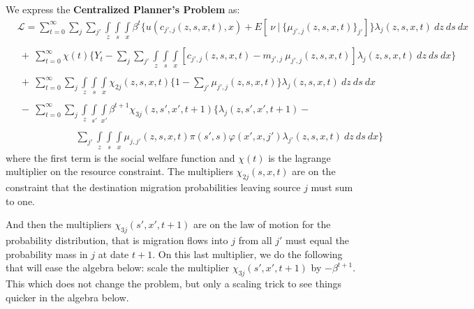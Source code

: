 \documentclass[12pt,pdftex]{article}
\begin{document}
\begin{onehalfspacing}
We express the \textbf{Centralized Planner's Problem} as:
{\small
\begin{align}
& \mathcal{L}  =   \sum_{t=0}^{\infty}\sum_{j} \sum_{j'} \int\limits_{z} \int\limits_{s} \int\limits_{x} \beta^{t} \bigg \{ u(c_{j',j}(z, s, x, t), x) + E[ \ \nu \ | \ \big\{\mu_{j',j}(z,s,x,t)\big\}_{j'}] \bigg \} \lambda_{j}(z, s, x, t) \ dz \ ds \ dx \label{eq:planner_L} \\
\nonumber \\
 & \ + \ \sum_{t=0}^{\infty} \chi(t) \bigg \{ Y_t - \sum_{j}\sum_{j'} \int\limits_{z} \int\limits_{s} \int\limits_{x} \left[ c_{j',j}(z, s, x, t)  -   m_{j',j} \ \mu_{j',j}(z, s, x, t)\right] \lambda_{j}(z, s, x, t) \ dz \ ds \ dx \bigg \} \nonumber \\
\nonumber  \\
& \ + \ \sum_{t=0}^{\infty} \sum_{j} \int\limits_{z} \int\limits_{s} \int\limits_{x} \chi_{2j}(z, s, x, t) \bigg \{1 - \sum_{j'} \mu_{j',j}(z, s, x,t) \bigg \} \lambda_{j}(z, s, x, t) \ dz \ ds \ dx \nonumber \\
\nonumber \\
& \ - \ \sum_{t=0}^{\infty} \sum_{j} \int\limits_{z} \int\limits_{s'} \int\limits_{x'} \beta^{t+1} \chi_{3j}(z, s', x', t+1) \bigg \{\lambda_{j}(z, s', x', t+1) - \nonumber \\
\nonumber \\
& \ \ \ \ \ \ \ \ \ \ \ \ \ \ \ \ \ \ \ \ \ \ \ \ \ \ \ 
 \sum_{j'} \int\limits_{z} \int\limits_{s} \int\limits_{x} \mu_{j,j'}(z,s,x,t) \pi(s',s) \varphi(x',x, j') \lambda_{j'}(z,s, x, t) \ dz \ ds  \ dx  \bigg \} \nonumber
\end{align}}
where the first term is the social welfare function and $\chi(t)$ is the lagrange multiplier on the resource constraint. The multipliers $\chi_{2j}(s, x, t)$ are on the constraint that the destination migration  probabilities leaving source $j$ must sum to one.

And then the multipliers $\chi_{3j}(s', x', t+1)$ are on the law of motion for the probability distribution, that is migration flows into $j$ from all $j'$ must equal the probability mass in $j$ at date $t+1$. On this last multiplier, we do the following that will ease the algebra below: scale the multiplier $\chi_{3j}(s', x', t+1)$ by $-\beta^{t+1}$. This which does not change the problem, but only a scaling trick to see things quicker in the algebra below. 


\end{onehalfspacing}
\end{document}

